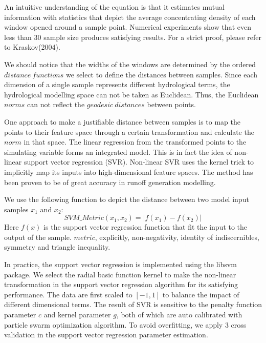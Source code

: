 An intuitive understanding of the equation is that it 
estimates mutual information with statistics that depict 
the average concentrating density of each window opened 
around a sample point. Numerical experiments show that even 
less than 30 sample size produces satisfying results. For a 
strict proof, please refer to Kraskov(2004).

We should notice that the widths of the windows are 
determined by the ordered $distance~functions$ we select to 
define the distances between samples. Since each dimension 
of a single sample represents different hydrological terms, 
the hydrological modelling space can not be taken as 
Euclidean. Thus, the Euclidean $norms$ can not reflect the 
$geodesic      ~distances$ between points. 
 
 
One approach to make a justifiable distance between samples 
  is to map the points to their feature space through a 
certain transformation and calculate the $norm$ in that 
space. The linear regression from the transformed points to 
the simulating variable forms an integrated model. This is 
in fact the idea of non-linear support vector regression
(SVR). Non-linear SVR uses the kernel trick to implicitly 
map its inputs into high-dimensional feature spaces. The 
method has been proven to be of great accuracy in runoff 
generation modelling\cite
{dibike2001model,lin2006using,asefa2006multi,behzad2009gene
ralization,phdgong}.

We use the following function to depict the distance 
between two model input samples $x_1$ and $x_2$:
\begin{equation}\label{svm}
SVM\_Metric(x_1,x_2)=|f(x_1)-f(x_2)|
\end{equation}
Here $f(x)$ is the support vector regression function that 
fit the input to the output of the sample.   
$metric$, explicitly, non-negativity, identity of 
indiscernibles, symmetry and triangle inequality. 

In practice, the support vector regression is implemented 
using the libsvm package\cite{chang2011libsvm}.  We select 
the radial basic function kernel to make the non-linear 
transformation in the support vector regression algorithm 
for its satisfying performance. The data are first scaled 
to $[-1,1]$ to balance the impact of different dimensional 
terms. The result of SVR is sensitive to the penalty 
function parameter $c$ and kernel parameter $g$, both of 
which are auto calibrated with particle swarm optimization 
algorithm\cite{shi1998modified}. To avoid overfitting, we 
apply  3 cross validation in the support vector regression 
parameter estimation. 

